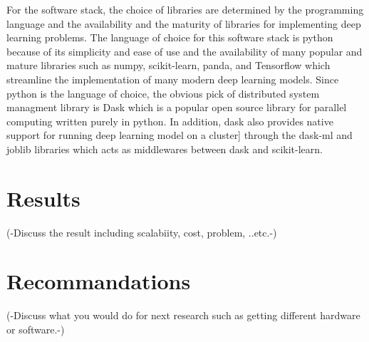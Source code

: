\documentclass{IEEEtran}
\begin{document}
        For the software stack, the choice of libraries are determined by the programming language and the availability and the maturity of libraries for implementing deep learning problems. The language of choice for this software stack is python because of its simplicity and ease of use and the availability of many popular and mature libraries such as numpy, scikit-learn, panda, and Tensorflow which streamline the implementation of many modern deep learning models. Since python is the language of choice, the obvious pick of distributed system managment library is Dask which is a popular open source library for parallel computing written purely in python. In addition, dask also provides native support for running deep learning model on a cluster] through the dask-ml and joblib libraries which acts as middlewares between dask and scikit-learn. 

    \section{Results}
        (-Discuss the result including scalabiity, cost, problem, ..etc.-)

    \section{Recommandations}
        (-Discuss what you would do for next research such as getting different hardware or software.-)\nocite{*}

    
    
    
\end{document}
